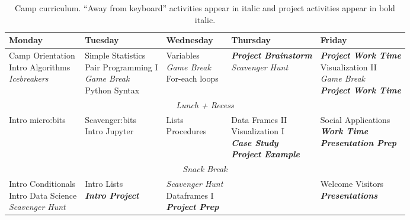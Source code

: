 \newcommand{\afk}[1]{\textit{#1}}
\newcommand{\proj}[1]{\textit{\textbf{#1}}}
\newcommand{\commonactivity}[1]{\multicolumn{5}{|c|}{#1}}

\renewcommand\cellalign{lt}
\begin{table*}[t]
\centering
\begin{tabular}{|l|l|l|l|l|}
\hline
\textbf{Monday} 	& \textbf{Tuesday} 	& \textbf{Wednesday} 	& \textbf{Thursday} 		& \textbf{Friday} \\ \hline \hline

\makecell{Camp Orientation \\ Intro Algorithms \\ \afk{Icebreakers}} 
	& \makecell{Simple Statistics \\ Pair Programming I \\ \afk{Game Break} \\ Python Syntax}
	& \makecell{Variables \\ \afk{Game Break} \\ For-each loops}
	& \makecell{\proj{Project Brainstorm} \\ \afk{Scavenger Hunt}}
	& \makecell{\proj{Project Work Time} \\ Visualization II \\ \afk{Game Break} \\ \proj{Project Work Time}} 
	\\ \hline 

\commonactivity{\afk{Lunch + Recess}}
	\\ \hline

Intro micro:bits
	& \makecell{Scavenger:bits \\ Intro Jupyter} 
	& \makecell{Lists \\ Procedures} 
	& \makecell{Data Frames II \\ Visualization I \\ \proj{Case Study} \\ \proj{Project Example}} 
	& \makecell{Social Applications \\ \proj{Work Time} \\ \proj{Presentation Prep}}
	\\ \hline

\commonactivity{\afk{Snack Break}}
	\\ \hline 

\makecell{Intro Conditionals \\ Intro Data Science \\ \afk{Scavenger Hunt}}
	& \makecell{Intro Lists \\ \proj{Intro Project}}
	& \makecell{\afk{Scavenger Hunt} \\ Dataframes I \\ \proj{Project Prep}}
	& \makecell{\proj{Project Work Time}}
	& \makecell{Welcome Visitors \\ \proj{Presentations}}
	\\ \hline

\end{tabular}
\caption{Camp curriculum.  ``Away from keyboard'' activities appear in italic and project activities appear in bold italic.}
\label{table:curriculum}
\end{table*}
